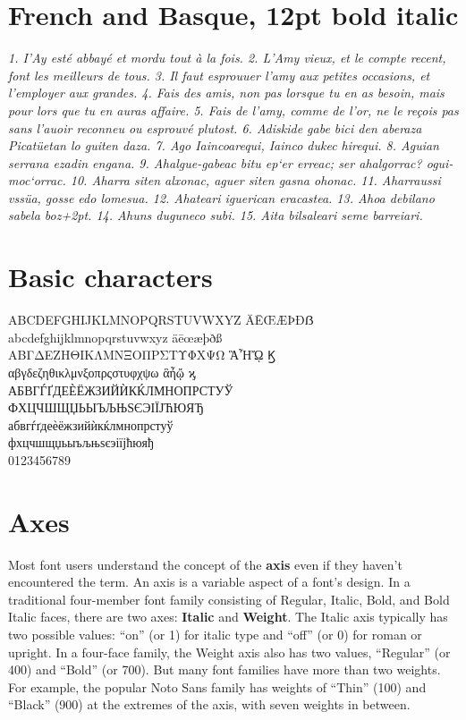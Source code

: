 \documentclass[12pt]{book}
\begin{document}
\section*{French and Basque, 12pt bold italic}

\textit{1. I'Ay esté abbayé et mordu tout à la fois.
2. L'Amy vieux, et le compte recent, font les meilleurs de tous.
3. Il faut esprouuer l'amy aux petites occasions, et l'employer aux grandes.
4. Fais des amis, non pas lorsque tu en as besoin, mais pour lors que tu en auras affaire.
5. Fais de l'amy, comme de l'or, ne le reçois pas sans l'auoir reconneu ou esprouvé plutost.
6. Adiskide gabe bici den aberaza Picatüetan
lo guiten daza. 7. Ago Iaincoarequi, Iainco dukec hirequi.
8. Aguian serrana ezadin engana.  9. Ahalgue-gabeac bitu ep‘er erreac;
ser ahalgorrac? ogui-moc‘orrac.  10. Aharra siten alxonac, aguer siten gasna
ohonac. 11. Aharraussi vssüa, gosse edo lomesua.
12. Ahateari iguerican eracastea. 13. Ahoa debilano sabela boz\kern+2pt.
14. Ahuns duguneco subi. 15. Aita bilsaleari seme barreiari.}

\section*{Basic characters}

\begin{center}\Large
ABCDEFGHIJKLMNOPQRSTUVWXYZ ÄĒŒÆÞÐẞ\\
abcdefghijklmnopqrstuvwxyz äēœæþðß\\
ΑΒΓΔΕΖΗΘΙΚΛΜΝΞΟΠΡΣΤΥΦΧΨΩ ἋἮᾬ Ϗ\\
αβγδεζηθικλμνξοπρςστυφχψω ἃἦᾤ ϗ\\
АБВГЃҐДЕЀЁЖЗИЙЍКЌЛМНОПРСТУЎ\\
ФХЦЧШЩЏЬЫЪЉЊЅЄЭІЇЈЋЮЯЂ\\
абвгѓґдеѐёжзийѝкќлмнопрстуў\\
фхцчшщџьыъљњѕєэіїјћюяђ\\
0123456789
\end{center}
\pagebreak


\section*{Axes}

Most font users understand the concept of the \textbf{axis} even if they haven’t encountered the term.
An axis is a variable aspect of a font’s design. In a traditional four-member font family
consisting of Regular, Italic, Bold, and Bold Italic faces, there are two axes: \textbf{Italic}
and \textbf{Weight}. The Italic axis typically has two possible values: “on” (or 1) for italic type
and “off” (or 0) for roman or upright. In a four-face family, the Weight axis also has two
values, “Regular” (or 400) and “Bold” (or 700). But many font families have more than two weights.
For example, the popular Noto Sans family has weights of “Thin” (100) and “Black” (900) at the
extremes of the axis, with seven weights in between.
\end{document}
